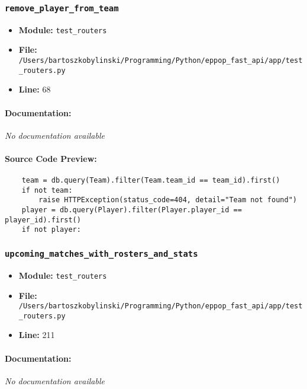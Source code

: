 \documentclass[11pt,a4paper]{article}
\begin{document}
\vspace{1em}
\subsubsection{\texttt{remove\_player\_from\_team}}

\begin{itemize}
    \item \textbf{Module:} \texttt{test\_routers}
    \item \textbf{File:} \texttt{/Users/bartoszkobylinski/Programming/Python/eppop\_fast\_api/app/test\_routers.py}
    \item \textbf{Line:} 68
\end{itemize}

\paragraph{Documentation:} \textit{No documentation available}

\paragraph{Source Code Preview:}
\begin{verbatim}
    team = db.query(Team).filter(Team.team_id == team_id).first()
    if not team:
        raise HTTPException(status_code=404, detail="Team not found")
    player = db.query(Player).filter(Player.player_id == player_id).first()
    if not player:
\end{verbatim}

\vspace{1em}
\subsubsection{\texttt{upcoming\_matches\_with\_rosters\_and\_stats}}

\begin{itemize}
    \item \textbf{Module:} \texttt{test\_routers}
    \item \textbf{File:} \texttt{/Users/bartoszkobylinski/Programming/Python/eppop\_fast\_api/app/test\_routers.py}
    \item \textbf{Line:} 211
\end{itemize}

\paragraph{Documentation:} \textit{No documentation available}
\end{document}
